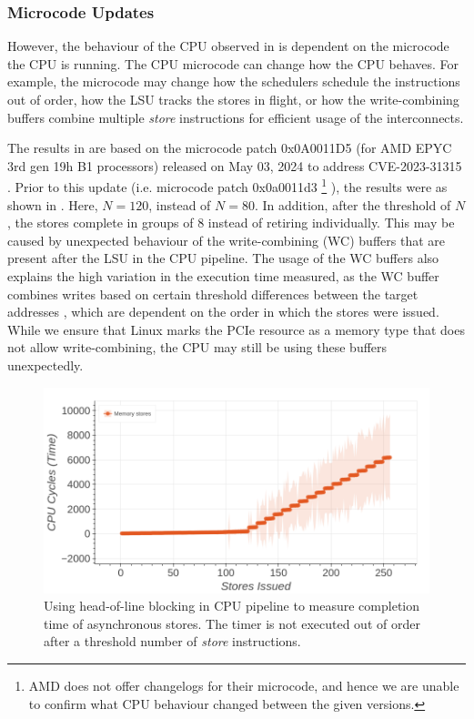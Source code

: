\subsubsection{Microcode Updates}
\label{subsubsec:interconnect-sc-store-ops-challenges-microcode-updates}
However, the behaviour of the CPU observed in  is dependent on the microcode the CPU is running.
The CPU microcode can change how the CPU behaves.
For example, the microcode may change how the schedulers schedule the instructions out of order, how the LSU tracks the stores in flight, or how the write-combining buffers combine multiple \textit{store} instructions for efficient usage of the interconnects.

The results in  are based on the microcode patch 0x0A0011D5 (for AMD EPYC 3rd gen 19h B1 processors) released on May 03, 2024 to address CVE-2023-31315 \cite{amd_microcode_update}.
Prior to this update (i.e. microcode patch 0x0a0011d3
\footnote{AMD does not offer changelogs for their microcode, and hence we are unable to confirm what CPU behaviour changed between the given versions.}
), the results were as shown in .
Here, $N = 120$, instead of $N = 80$. 
In addition, after the threshold of $N$, the stores complete in groups of $8$ instead of retiring individually.
This may be caused by unexpected behaviour of the write-combining (WC) buffers that are present after the LSU in the CPU pipeline.
The usage of the WC buffers also explains the high variation in the execution time measured, as the WC buffer combines writes based on certain threshold differences between the target addresses \cite{amd_7003_software_optimization_guide}, which are dependent on the order in which the stores were issued.
While we ensure that Linux marks the PCIe resource as a memory type that does not allow write-combining, the CPU may still be using these buffers unexpectedly.


\begin{figure}[!htb]
    \centering
    \includegraphics[width=\columnwidth]{figures/interconnect-sc/store-ops/measuring_store_time_before_microcode_update.png}
    \caption{Using head-of-line blocking in CPU pipeline to measure completion time of asynchronous stores.
    The timer is not executed out of order after a threshold number of \textit{store} instructions.}
    \label{fig:measuring-store-time-before-microcode-update}
\end{figure}

